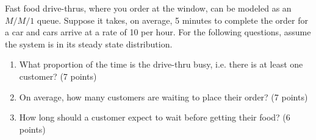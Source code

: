
\item Fast food drive-thrus, where you order at the window, can be modeled as 
an $M/M/1$ queue. 
Suppose it takes, on average, 5 minutes to complete the order for a car and 
cars arrive at a rate of 10 per hour. 
For the following questions, assume the system is in its steady state 
distribution.

\begin{enumerate}
\item What proportion of the time is the drive-thru busy, i.e. there is at least
one customer? (7 points)

\vfill


\item On average, how many customers are waiting to place their order? (7 points)

\vfill

\item How long should a customer expect to wait before getting their food? 
(6 points)

\vfill

\end{enumerate}